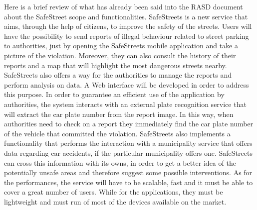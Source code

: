 Here is a brief review of what has already been said into the RASD document about the SafeStreet scope and functionalities.
\newline
SafeStreets is a new service that aims, through the help of citizens, to improve the safety of the streets. Users will have the possibility to send reports of illegal behaviour related to street parking to authorities, just by opening the SafeStreets mobile application and take a picture of the violation. Moreover, they can also consult the history of their reports and a map that will highlight the most dangerous streets nearby. SafeStreets also offers a way for the authorities to manage the reports and perform analysis on data. A Web interface will be developed in order to address this purpose. In order to guarantee an efficient use of the application by authorities, the system interacts with an external plate recognition service that will extract the car plate number from the report image. In this way, when authorities need to check on a report they immediately find the car plate number of the vehicle that committed the violation. SafeStreets also implements a functionality that performs the interaction with a municipality service that offers data regarding car accidents, if the particular municipality offers one. SafeStreets can cross this information with its owns, in order to get a better idea of the potentially unsafe areas and therefore suggest some possible interventions.
As for the performances, the service will have to be scalable,
fast and it must be able to cover a great number of users. While for the applications, they must be lightweight and must run of most of the devices available on the market.
